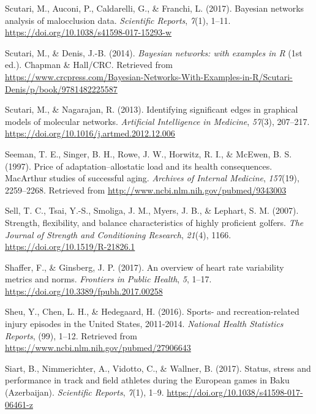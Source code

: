 \documentclass[
  english,
  man,floatsintext]{apa6}
\begin{document}
\leavevmode\hypertarget{ref-Scutari2017}{}%
Scutari, M., Auconi, P., Caldarelli, G., \& Franchi, L. (2017). Bayesian networks analysis of malocclusion data. \emph{Scientific Reports}, \emph{7}(1), 1--11. \url{https://doi.org/10.1038/s41598-017-15293-w}

\leavevmode\hypertarget{ref-Scutari2014}{}%
Scutari, M., \& Denis, J.-B. (2014). \emph{Bayesian networks: with examples in R} (1st ed.). Chapman \& Hall/CRC. Retrieved from \url{https://www.crcpress.com/Bayesian-Networks-With-Examples-in-R/Scutari-Denis/p/book/9781482225587}

\leavevmode\hypertarget{ref-Scutari2013}{}%
Scutari, M., \& Nagarajan, R. (2013). Identifying significant edges in graphical models of molecular networks. \emph{Artificial Intelligence in Medicine}, \emph{57}(3), 207--217. \url{https://doi.org/10.1016/j.artmed.2012.12.006}

\leavevmode\hypertarget{ref-Seeman1997}{}%
Seeman, T. E., Singer, B. H., Rowe, J. W., Horwitz, R. I., \& McEwen, B. S. (1997). Price of adaptation--allostatic load and its health consequences. MacArthur studies of successful aging. \emph{Archives of Internal Medicine}, \emph{157}(19), 2259--2268. Retrieved from \url{http://www.ncbi.nlm.nih.gov/pubmed/9343003}

\leavevmode\hypertarget{ref-Sell2007}{}%
Sell, T. C., Tsai, Y.-S., Smoliga, J. M., Myers, J. B., \& Lephart, S. M. (2007). Strength, flexibility, and balance characteristics of highly proficient golfers. \emph{The Journal of Strength and Conditioning Research}, \emph{21}(4), 1166. \url{https://doi.org/10.1519/R-21826.1}

\leavevmode\hypertarget{ref-Shaffer2017}{}%
Shaffer, F., \& Ginsberg, J. P. (2017). An overview of heart rate variability metrics and norms. \emph{Frontiers in Public Health}, \emph{5}, 1--17. \url{https://doi.org/10.3389/fpubh.2017.00258}

\leavevmode\hypertarget{ref-Sheu2016}{}%
Sheu, Y., Chen, L. H., \& Hedegaard, H. (2016). Sports- and recreation-related injury episodes in the United States, 2011-2014. \emph{National Health Statistics Reports}, (99), 1--12. Retrieved from \url{https://www.ncbi.nlm.nih.gov/pubmed/27906643}

\leavevmode\hypertarget{ref-Siart2017}{}%
Siart, B., Nimmerichter, A., Vidotto, C., \& Wallner, B. (2017). Status, stress and performance in track and field athletes during the European games in Baku (Azerbaijan). \emph{Scientific Reports}, \emph{7}(1), 1--9. \url{https://doi.org/10.1038/s41598-017-06461-z}
\end{document}
